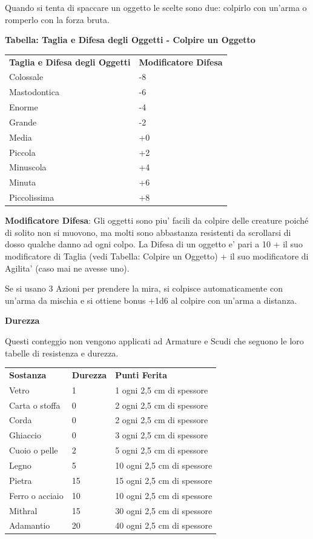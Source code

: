 \documentclass[a4paper,11pt,twoside,openany]{book}
\begin{document}
{		Quando si tenta di spaccare un oggetto le scelte sono due: colpirlo con un'arma o romperlo con la forza bruta.
		
		\textbf{Tabella: Taglia e Difesa degli Oggetti - Colpire un Oggetto}
		\medskip
		
		\begin{tabular}{ll}
			\toprule
			\textbf{Taglia e Difesa degli Oggetti} & \textbf{Modificatore Difesa}\tabularnewline
			Colossale & -8\tabularnewline
			Mastodontica & -6\tabularnewline
			Enorme & -4\tabularnewline
			Grande & -2\tabularnewline
			Media & +0\tabularnewline
			Piccola & +2\tabularnewline
			Minuscola & +4\tabularnewline
			Minuta & +6\tabularnewline
			Piccolissima & +8\tabularnewline
		\end{tabular}
		
		\bigskip
		
		\textbf{Modificatore Difesa}: Gli oggetti sono piu' facili da colpire delle creature poiché di solito non si muovono, ma molti sono abbastanza resistenti da scrollarsi di dosso qualche danno ad ogni colpo. La Difesa di un oggetto e' pari a 10 + il suo modificatore di Taglia (vedi Tabella: Colpire un Oggetto) + il suo modificatore di Agilita' (caso mai ne avesse uno).
		
		Se si usano 3 Azioni per prendere la mira, si colpisce automaticamente con un'arma da mischia e si ottiene bonus +1d6 al colpire con un'arma a distanza.
		
		\textbf{Durezza}
		
		Questi conteggio non vengono applicati ad Armature e Scudi che seguono le loro tabelle di resistenza e durezza.
		
		\bigskip
		
		\begin{tabular}{lll}
			\toprule
			\textbf{Sostanza} & \textbf{Durezza} & \textbf{Punti Ferita} \tabularnewline
			Vetro & 1 & 1 ogni 2,5 cm di spessore\tabularnewline
			Carta o stoffa & 0 & 2 ogni 2,5 cm di spessore\tabularnewline
			Corda & 0 & 2 ogni 2,5 cm di spessore\tabularnewline
			Ghiaccio & 0 & 3 ogni 2,5 cm di spessore\tabularnewline
			Cuoio o pelle & 2 & 5 ogni 2,5 cm di spessore\tabularnewline
			Legno & 5 & 10 ogni 2,5 cm di spessore\tabularnewline
			Pietra & 15 & 15 ogni 2,5 cm di spessore\tabularnewline
			Ferro o acciaio & 10 & 10 ogni 2,5 cm di spessore\tabularnewline
			Mithral & 15 & 30 ogni 2,5 cm di spessore\tabularnewline
			Adamantio & 20 & 40 ogni 2,5 cm di spessore\tabularnewline
		\end{tabular}
		
}
\end{document}
